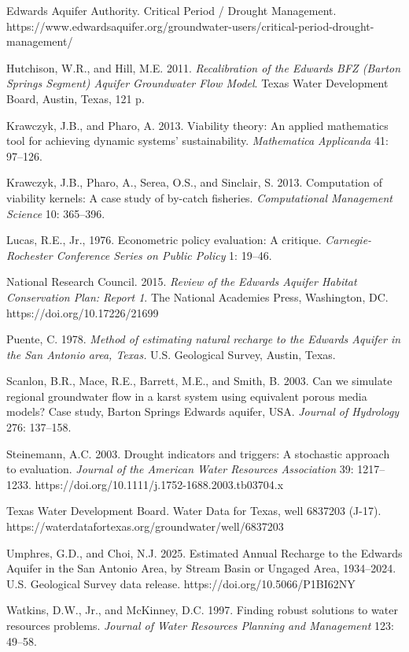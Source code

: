 \documentclass[11pt]{article}
\begin{document}
Edwards Aquifer Authority. Critical Period / Drought Management.
https://www.edwardsaquifer.org/groundwater-users/critical-period-drought-management/

Hutchison, W.R., and Hill, M.E. 2011. \emph{Recalibration of the Edwards
BFZ (Barton Springs Segment) Aquifer Groundwater Flow Model}. Texas
Water Development Board, Austin, Texas, 121 p.

Krawczyk, J.B., and Pharo, A. 2013. Viability theory: An applied
mathematics tool for achieving dynamic systems' sustainability.
\emph{Mathematica Applicanda} 41: 97--126.

Krawczyk, J.B., Pharo, A., Serea, O.S., and Sinclair, S. 2013.
Computation of viability kernels: A case study of by-catch fisheries.
\emph{Computational Management Science} 10: 365--396.

Lucas, R.E., Jr., 1976. Econometric policy evaluation: A critique.
\emph{Carnegie-Rochester Conference Series on Public Policy} 1: 19--46.

National Research Council. 2015. \emph{Review of the Edwards Aquifer
Habitat Conservation Plan: Report 1}. The National Academies Press,
Washington, DC. https://doi.org/10.17226/21699

Puente, C. 1978. \emph{Method of estimating natural recharge to the
Edwards Aquifer in the San Antonio area, Texas.} U.S. Geological Survey,
Austin, Texas.

Scanlon, B.R., Mace, R.E., Barrett, M.E., and Smith, B. 2003. Can we
simulate regional groundwater flow in a karst system using equivalent
porous media models? Case study, Barton Springs Edwards aquifer, USA.
\emph{Journal of Hydrology} 276: 137--158.

Steinemann, A.C. 2003. Drought indicators and triggers: A stochastic
approach to evaluation. \emph{Journal of the American Water Resources
Association} 39: 1217--1233.
https://doi.org/10.1111/j.1752-1688.2003.tb03704.x

Texas Water Development Board. Water Data for Texas, well 6837203
(J-17). https://waterdatafortexas.org/groundwater/well/6837203

Umphres, G.D., and Choi, N.J. 2025. Estimated Annual Recharge to the
Edwards Aquifer in the San Antonio Area, by Stream Basin or Ungaged
Area, 1934--2024. U.S. Geological Survey data release.
https://doi.org/10.5066/P1BI62NY

Watkins, D.W., Jr., and McKinney, D.C. 1997. Finding robust solutions to
water resources problems. \emph{Journal of Water Resources Planning and
Management} 123: 49--58.
\end{document}
